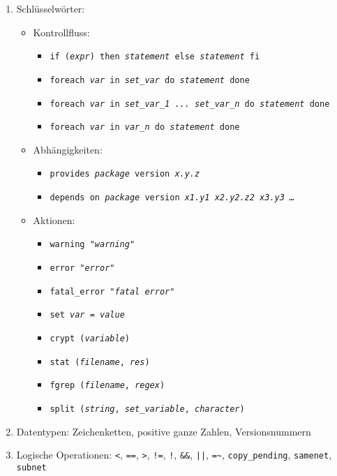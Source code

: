     \begin{enumerate}
    \item Schlüsselwörter:

      \begin{itemize}
      \item Kontrollfluss:

        \begin{itemize}
        \item \texttt{if (\textit{expr}) then \textit{statement} else \textit{statement} fi}
        \item \texttt{foreach \textit{var} in \textit{set\_var} do \textit{statement} done}
        \item \texttt{foreach \textit{var} in \textit{set\_var\_1 ... set\_var\_n} do \textit{statement} done}
        \item \texttt{foreach \textit{var} in \textit{var\_n} do \textit{statement} done}
        \end{itemize}

      \item
        Abhängigkeiten:
        \begin{itemize}
        \item \texttt{provides \textit{package} version \textit{x.y.z}}
        \item \texttt{depends on \textit{package} version \textit{x1.y1 x2.y2.z2 x3.y3 \ldots}}
        \end{itemize}

      \item Aktionen:
        \begin{itemize}
        \item \texttt{warning "\textit{warning}"}
        \item \texttt{error   "\textit{error}"}
        \item \texttt{fatal\_error "\textit{fatal error}"}
        \item \texttt{set \textit{var} = \textit{value}}
        \item \texttt{crypt (\textit{variable})}
        \item \texttt{stat (\textit{filename}, \textit{res})}
        \item \texttt{fgrep (\textit{filename}, \textit{regex})}
        \item \texttt{split (\textit{string}, \textit{set\_variable}, \textit{character})}
        \end{itemize}
      \end{itemize}
    \item Datentypen:      Zeichenketten, positive ganze Zahlen, Versionsnummern
    \item Logische Operationen:    \texttt{<}, \texttt{==}, \texttt{>}, \texttt{!=}, \texttt{!}, \texttt{\&\&}, \texttt{||},
      \texttt{=}\verb+~+, \texttt{copy\_pending}, \texttt{samenet}, \texttt{subnet}
    \end{enumerate}

